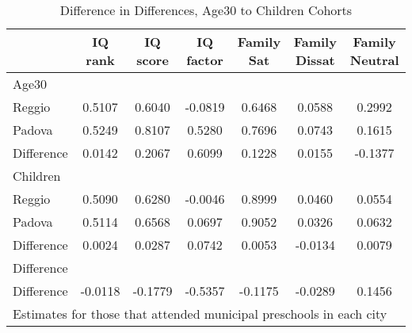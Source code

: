 \begin{table}[htbp]\centering
\caption{Difference in Differences, Age30 to Children Cohorts}
\begin{tabular}{l*{6}{c}}
\hline\hline
            &     IQ rank&    IQ score&   IQ factor&  Family Sat&Family Dissat&Family Neutral\\
\hline
Age30       &            &            &            &            &            &            \\
Reggio      &      0.5107&      0.6040&     -0.0819&      0.6468&      0.0588&      0.2992\\
Padova      &      0.5249&      0.8107&      0.5280&      0.7696&      0.0743&      0.1615\\
Difference  &      0.0142&      0.2067&      0.6099&      0.1228&      0.0155&     -0.1377\\
\hline
Children    &            &            &            &            &            &            \\
Reggio      &      0.5090&      0.6280&     -0.0046&      0.8999&      0.0460&      0.0554\\
Padova      &      0.5114&      0.6568&      0.0697&      0.9052&      0.0326&      0.0632\\
Difference  &      0.0024&      0.0287&      0.0742&      0.0053&     -0.0134&      0.0079\\
\hline
Difference  &            &            &            &            &            &            \\
Difference  &     -0.0118&     -0.1779&     -0.5357&     -0.1175&     -0.0289&      0.1456\\
\hline\hline
\multicolumn{7}{l}{\footnotesize Estimates for those that attended municipal preschools in each city}\\
\end{tabular}
\end{table}
